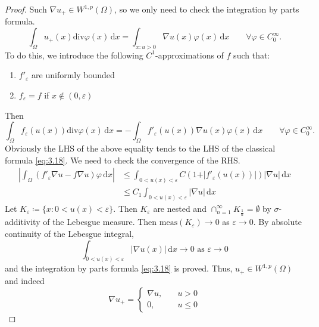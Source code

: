 \documentclass{report}
\begin{document}
\begin{proof}
    Such \(\nabla u_{+} \in W^{1, p}(\Omega)\), so we only need to check the integration by parts formula.
    \begin{equation}\label{eq:3.18}
        \int_{\Omega} u_{+}(x) \text{div}\varphi(x) \,\mathrm{d}x = \int_{x: u > 0} \nabla u(x) \varphi(x) \,\mathrm{d}x \qquad \forall \varphi \in C^{\infty}_{0}. 
    \end{equation}
    To do this, we introduce the following \(C^{1}\)-approximations of \(f\) such that:
    \begin{enumerate}
        \item \(f'_{\varepsilon}\) are uniformly bounded
        \item \(f_{\varepsilon} = f\) if \(x \notin (0, \varepsilon)\)
    \end{enumerate} 
    Then 
    \[
        \int_{\Omega} f_{\varepsilon}(u(x))\text{div}\varphi(x) \,\mathrm{d}x = - \int_{\Omega} f'_{\varepsilon}(u(x)) \nabla u(x) \varphi(x) \,\mathrm{d}x \qquad \forall \varphi \in C^{\infty}_{0}.
    \]
    Obviously the LHS of the above equality tends to the LHS of the classical formula \ref{eq:3.18}. We need to check the convergence of the RHS.
    \begin{align*}
        \left\vert \int_{\Omega} (f'_{\varepsilon} \nabla u - f \nabla u) \varphi \,\mathrm{d}x \right\vert & \leq \int_{0 < u(x) < \varepsilon} C(1+\vert f'_{\varepsilon}(u(x))\vert) \vert \nabla u \vert \,\mathrm{d}x \\
        & \leq C_{1} \int_{0 < u(x) < \varepsilon} \vert \nabla u \vert \,\mathrm{d}x
    \end{align*}
    Let \(K_{\varepsilon} \coloneqq \{x \colon 0 < u(x) < \varepsilon\}\). Then \(K_{\varepsilon}\) are nested and \(\cap_{n=1}^{\infty}K_{\frac{1}{n}} = \emptyset\) by \(\sigma\)-additivity of the Lebesgue measure. Then \(\text{meas}(K_{\varepsilon}) \to 0\) as \(\varepsilon \to 0\). By absolute continuity of the Lebesgue integral, 
    \[
        \int_{0 < u(x) < \varepsilon} \vert \nabla u(x) \vert \,\mathrm{d}x \to 0 \text{ as } \varepsilon \to 0
    \]
    and the integration by parts formula \ref{eq:3.18} is proved. Thus, \(u_{+} \in W^{1, p}(\Omega)\) and indeed
    \[
        \nabla u_{+} = \left\{\begin{aligned}
            \nabla u, & \quad u > 0 \\
            0, & \quad u \leq 0
        \end{aligned}\right.
    \]
\end{proof}
\end{document}
